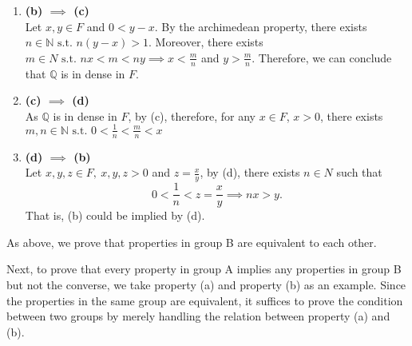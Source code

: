 \documentclass[a4pap er]{article}
\newcommand{\N}{\mathbb{N}}
\newcommand{\Q}{\mathbb{Q}}
\newcommand{\st}{\text{ s.t. }}
\theoremstyle{plain}
\begin{document}
\begin{enumerate}
    \item \textbf{(b) $\implies$ (c)} \\
Let $x, y \in F$ and $0 < y-x$. By the archimedean
property, there exists $n \in \N \st n(y-x) > 1$.
Moreover, there exists $m \in N \st nx < m < ny \implies
x < \frac{m}{n}$ and $y > \frac{m}{n}$. Therefore, we can
conclude that $\Q$ is in dense in $F$.
\item \textbf{(c) $\implies$ (d)} \\
    As $\Q$ is in dense in $F$, by (c), therefore, 
    for any $x \in F$, $x>0$, there exists
    $m,n \in \N \st 0 < \frac{1}{n} < \frac{m}{n} < x$

\item \textbf{(d) $\implies$ (b)} \\
    Let $x,y,z \in F, \ x,y,z > 0$ and $z = \frac{x}{y}$, 
    by (d), there exists $n \in N$ such that
    \[
    0 < \frac{1}{n} < z = \frac{x}{y}
    \implies nx > y.
    \]
    That is, (b) could be implied by (d).
\end{enumerate}
As above, we prove that properties in group B are equivalent
to each other.

Next, to prove that every property in group A implies any
properties in group B but not the converse, we take 
property (a) and property (b) as an example. Since the 
properties in the same group are equivalent, it suffices to
prove the condition between two groups by merely handling 
the relation between property (a) and (b).
\end{document}
